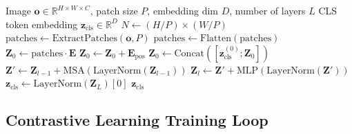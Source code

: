 \begin{algorithm}[H]
\caption{Vision Transformer Encoder}
\label{alg:vit_encoder}
\begin{algorithmic}[1]
\REQUIRE Image $\mathbf{o} \in \mathbb{R}^{H \times W \times C}$, patch size $P$, embedding dim $D$, number of layers $L$
\ENSURE CLS token embedding $\mathbf{z}_{\text{cls}} \in \mathbb{R}^D$
\STATE {}
\STATE $N \gets (H / P) \times (W / P)$ 
\STATE $\text{patches} \gets \text{ExtractPatches}(\mathbf{o}, P)$ 
\STATE $\text{patches} \gets \text{Flatten}(\text{patches})$ 
\STATE
\STATE {}
\STATE $\mathbf{Z}_0 \gets \text{patches} \cdot \mathbf{E}$ 
\STATE
\STATE {}
\STATE $\mathbf{Z}_0 \gets \mathbf{Z}_0 + \mathbf{E}_{\text{pos}}$ 
\STATE
\STATE {}
\STATE $\mathbf{Z}_0 \gets \text{Concat}([\mathbf{z}_{\text{cls}}^{(0)}; \mathbf{Z}_0])$ 
\STATE
\STATE {}
    \STATE {}
    \STATE $\mathbf{Z}' \gets \mathbf{Z}_{l-1} + \text{MSA}(\text{LayerNorm}(\mathbf{Z}_{l-1}))$
    \STATE
    \STATE {}
    \STATE $\mathbf{Z}_l \gets \mathbf{Z}' + \text{MLP}(\text{LayerNorm}(\mathbf{Z}'))$
\ENDFOR
\STATE
\STATE {}
\STATE $\mathbf{z}_{\text{cls}} \gets \text{LayerNorm}(\mathbf{Z}_L)[0]$ 
\RETURN $\mathbf{z}_{\text{cls}}$
\end{algorithmic}
\end{algorithm}

\subsection{Contrastive Learning Training Loop}

